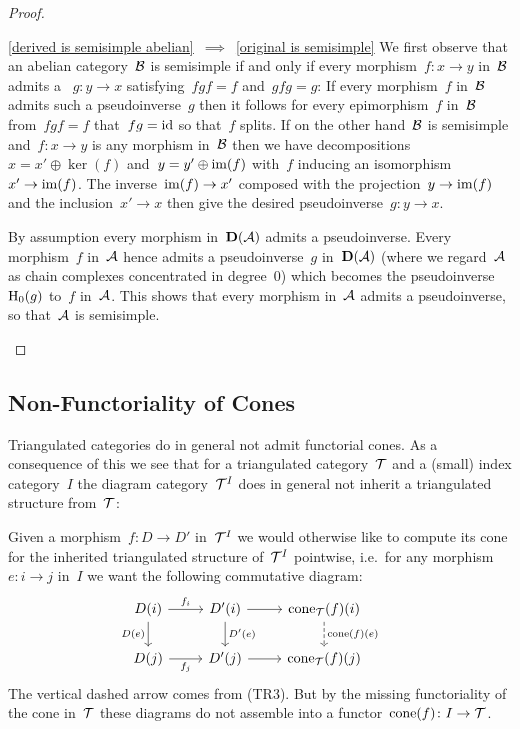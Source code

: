\documentclass[a4paper,10pt]{scrartcl}
\begin{document}
\begin{proof}
\begin{implicationslist}
    \item[\ref{derived is semisimple abelian}~$\implies$~\ref{original is semisimple}]
      We first observe that an abelian category~$\mathcal{B}$ is semisimple if and only if every morphism~$f \colon x \to y$ in~$\mathcal{B}$ admits a ~$g \colon y \to x$ satisfying~$fgf = f$ and~$gfg = g$:
      If every morphism~$f$ in~$\mathcal{B}$ admits such a pseudoinverse~$g$ then it follows for every epimorphism~$f$ in~$\mathcal{B}$ from~$fgf = f$ that~$fg = \mathrm{id}$ so that~$f$ splits. 
      If on the other hand~$\mathcal{B}$ is semisimple and~$f \colon x \to y$ is any morphism in~$\mathcal{B}$ then we have decompositions~$x = x' \oplus \ker(f)$ and~$y = y' \oplus \operatorname{im}(f)$ with~$f$ inducing an isomorphism~$x' \to \operatorname{im}(f)$.
      The inverse~$\operatorname{im}(f) \to x'$ composed with the projection~$y \to \operatorname{im}(f)$ and the inclusion~$x' \to x$ then give the desired pseudoinverse~$g \colon y \to x$.
      
      By assumption every morphism in~$\mathbf{D}(\mathcal{A})$ admits a pseudoinverse.
      Every morphism~$f$ in~$\mathcal{A}$ hence admits a pseudoinverse~$g$ in~$\mathbf{D}(\mathcal{A})$ (where we regard~$\mathcal{A}$ as chain complexes concentrated in degree~$0$) which becomes the pseudoinverse~$\operatorname{H}_0(g)$ to~$f$ in~$\mathcal{A}$.
      This shows that every morphism in~$\mathcal{A}$ admits a pseudoinverse, so that~$\mathcal{A}$ is semisimple.
    \qedhere
  \end{implicationslist}
\end{proof}



\subsection{Non-Functoriality of Cones}

Triangulated categories do in general not admit functorial cones.
As a consequence of this we see that for a triangulated category~$\mathcal{T}$ and a (small) index category~$I$ the diagram category~$\mathcal{T}^I$ does in general not inherit a triangulated structure from~$\mathcal{T}$:

Given a morphism~$f \colon D \to D'$ in~$\mathcal{T}^I$ we would otherwise like to compute its cone for the inherited triangulated structure of~$\mathcal{T}^I$ pointwise, i.e.\ for any morphism~$e \colon i \to j$ in~$I$ we want the following commutative diagram:
\[
  \begin{tikzcd}
    D(i)
    \arrow{r}[above]{f_i}
    \arrow{d}[left]{D(e)}
    &
    D'(i)
    \arrow{d}[right]{D'(e)}
    \arrow{r}
    &
    \cone_{\Tcat}(f)(i)
    \arrow[dashed]{d}[right]{\cone(f)(e)}
    \\
    D(j)
    \arrow{r}[below]{f_j}
    &
    D'(j)
    \arrow{r}
    &
    \cone_{\Tcat}(f)(j)
    &
  \end{tikzcd}
\]
The vertical dashed arrow comes from (TR3).
But by the missing functoriality of the cone in~$\mathcal{T}$ these diagrams do not assemble into a functor~$\operatorname{cone}(f) \colon I \to \mathcal{T}$.
\end{document}
